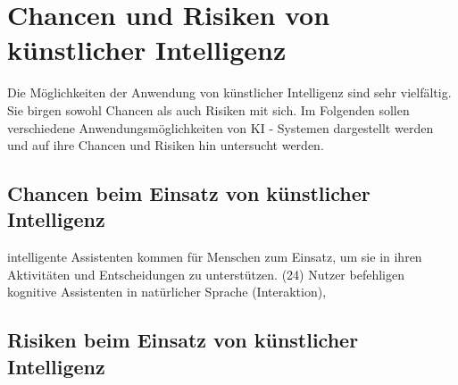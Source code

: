 \newpage
\section{Chancen und Risiken von künstlicher Intelligenz} \label{Chancen und Risken von KI}
Die Möglichkeiten der Anwendung von künstlicher Intelligenz sind sehr vielfältig. Sie birgen sowohl Chancen als auch Risiken mit sich. 
Im Folgenden sollen verschiedene Anwendungsmöglichkeiten von KI - Systemen dargestellt werden und auf ihre Chancen und Risiken hin untersucht werden. 
 

\subsection{Chancen beim Einsatz von künstlicher Intelligenz}
intelligente Assistenten kommen für Menschen zum Einsatz, um sie in ihren Aktivitäten und Entscheidungen zu unterstützen. (24)
Nutzer befehligen kognitive Assistenten in natürlicher Sprache (Interaktion),
\subsection{Risiken beim Einsatz von künstlicher Intelligenz}
